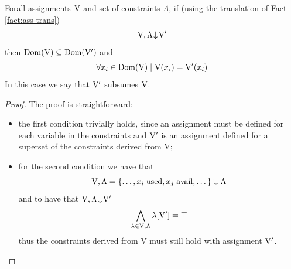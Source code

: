 \documentclass[a4paper, 12pt, english]{report}
\begin{document}
\begin{lemma}
	\label{lemma:constr}
	Forall assignments $\mathrm{V}$ and set of constraints $\Lambda$, if (using the translation of Fact \ref{fact:ass-trans})
	$$ \mathrm{V}, \Lambda\!\downarrow\!\mathrm{V}' $$
	then $\text{Dom}(\mathrm{V}) \subseteq \text{Dom}(\mathrm{V}')$ and
	$$ \forall x_i \in \text{Dom}(\mathrm{V}) \mid \mathrm{V}(x_i) = \mathrm{V}'(x_i) $$
	In this case we say that $\mathrm{V}'$ subsumes $\mathrm{V}$.
\end{lemma}
\begin{proof}
	The proof is straightforward: 
	\begin{itemize}
		\item the first condition trivially holds, since an assignment must be defined for each variable in the constraints and $\mathrm{V}'$ is an assignment defined for a superset of the constraints derived from V;
		\item for the second condition we have that
			$$ \mathrm{V}, \Lambda = \{ \dots, x_i \; \mathrm{used}, x_j \; \mathrm{avail}, \dots \} \cup \Lambda $$
		and to have that $ \mathrm{V}, \Lambda\!\downarrow\!\mathrm{V}' $
			$$ \bigwedge_{\lambda \in \mathrm{V}, \Lambda} \lambda[\mathrm{V}'] = \top $$
		thus the constraints derived from V must still hold with assignment $\mathrm{V}'$.
	\end{itemize}
	
\end{proof}
\end{document}
